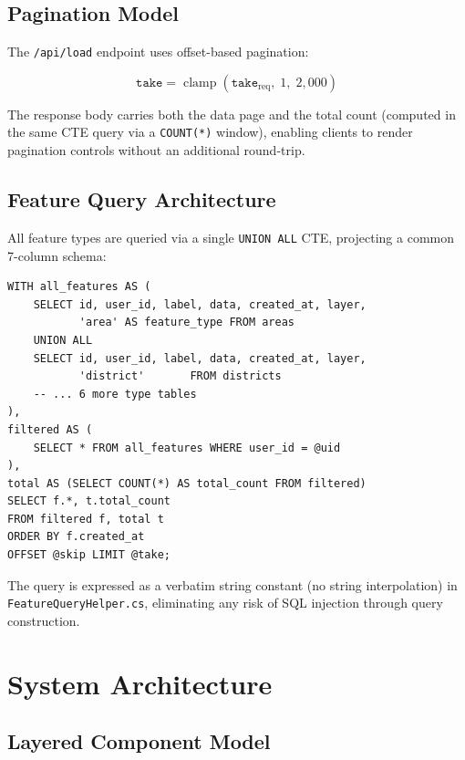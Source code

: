 \documentclass[12pt,a4paper]{article}
\theoremstyle{definition}
\theoremstyle{plain}
\theoremstyle{remark}
\begin{document}
\subsection{Pagination Model}

The \texttt{/api/load} endpoint uses offset-based pagination:

\begin{equation}
  \texttt{take} = \operatorname{clamp}(\texttt{take}_{\text{req}},\; 1,\; 2{,}000)
  \label{eq:pagination_clamp}
\end{equation}

The response body carries both the data page and the total count (computed
in the same CTE query via a \texttt{COUNT(*)} window), enabling clients to
render pagination controls without an additional round-trip.

\subsection{Feature Query Architecture}

All feature types are queried via a single \texttt{UNION ALL} CTE,
projecting a common 7-column schema:

\begin{lstlisting}[style=sqlstyle, caption={UNION ALL feature query skeleton}]
WITH all_features AS (
    SELECT id, user_id, label, data, created_at, layer,
           'area' AS feature_type FROM areas
    UNION ALL
    SELECT id, user_id, label, data, created_at, layer,
           'district'       FROM districts
    -- ... 6 more type tables
),
filtered AS (
    SELECT * FROM all_features WHERE user_id = @uid
),
total AS (SELECT COUNT(*) AS total_count FROM filtered)
SELECT f.*, t.total_count
FROM filtered f, total t
ORDER BY f.created_at
OFFSET @skip LIMIT @take;
\end{lstlisting}

The query is expressed as a verbatim string constant (no string
interpolation) in \texttt{FeatureQueryHelper.cs}, eliminating any risk
of SQL injection through query construction.

\section{System Architecture}
\label{sec:architecture}

\subsection{Layered Component Model}
\end{document}
